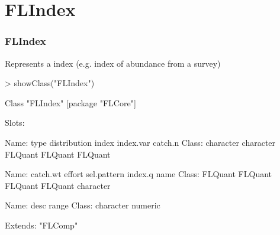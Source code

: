 \documentclass{beamer}%
\begin{document}
\section{FLIndex}
\begin{frame}[containsverbatim]
  \frametitle{FLIndex}
Represents a index (e.g. index of abundance from a survey)
{\scriptsize{
\begin{Schunk}
\begin{Sinput}
> showClass("FLIndex")
\end{Sinput}
\begin{Soutput}
Class "FLIndex" [package "FLCore"]

Slots:
                                                                       
Name:          type distribution        index    index.var      catch.n
Class:    character    character      FLQuant      FLQuant      FLQuant
                                                                       
Name:      catch.wt       effort  sel.pattern      index.q         name
Class:      FLQuant      FLQuant      FLQuant      FLQuant    character
                                
Name:          desc        range
Class:    character      numeric

Extends: "FLComp"
\end{Soutput}
\end{Schunk}
}}

\end{frame}

\end{document}
